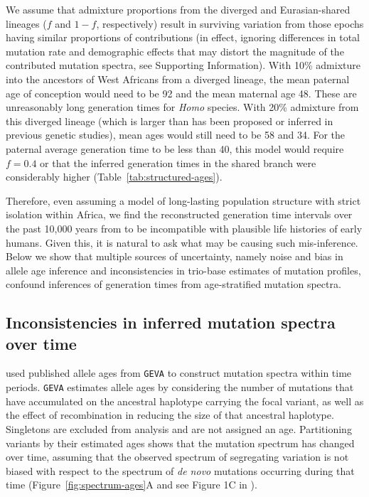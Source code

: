 \documentclass[]{article}
\newcommand{\GEVA}{\texttt{GEVA}\xspace}
\begin{document}
We assume that admixture proportions from the diverged and Eurasian-shared
lineages ($f$ and $1-f$, respectively) result in surviving variation from those
epochs having similar proportions of contributions (in effect, ignoring
differences in total mutation rate and demographic effects that may distort
the magnitude of the contributed mutation spectra, see Supporting Information).
With 10\% admixture into the ancestors of West Africans from a diverged
lineage, the mean paternal age of conception would need to be 92 and the mean
maternal age 48.  These are unreasonably long generation times for \emph{Homo}
species. With 20\% admixture from this diverged lineage (which is larger than
has been proposed or inferred in previous genetic studies), mean ages would
still need to be 58 and 34. For the paternal average generation time to be less
than 40, this model would require $f=0.4$ or that the inferred generation times
in the shared branch were considerably higher
(Table~\ref{tab:structured-ages}).

Therefore, even assuming a model of long-lasting population structure with
strict isolation within Africa, we find the reconstructed generation time
intervals over the past 10,000 years from \citet{wang2023human} to be
incompatible with plausible life histories of early humans. Given this, it is
natural to ask what may be causing such mis-inference. Below we show that
multiple sources of uncertainty, namely noise and bias in allele age inference
and inconsistencies in trio-base estimates of mutation profiles, confound
inferences of generation times from age-stratified mutation spectra.

\subsection*{Inconsistencies in inferred mutation spectra over time}

\citet{wang2023human} used
published allele ages from \GEVA \citep{albers2020dating}
to construct mutation spectra within time periods. \GEVA estimates
allele ages by considering the number of mutations that have accumulated on the
ancestral haplotype carrying the focal variant, as well as the effect of
recombination in reducing the size of that ancestral haplotype. Singletons are
excluded from analysis and are not assigned an age. Partitioning variants by
their estimated ages shows that the mutation spectrum has changed over time,
assuming that the observed spectrum of segregating variation is not biased with
respect to the spectrum of \emph{de novo} mutations occurring during that time
(Figure~\ref{fig:spectrum-ages}A and see Figure 1C in \citet{wang2023human}).
\end{document}
